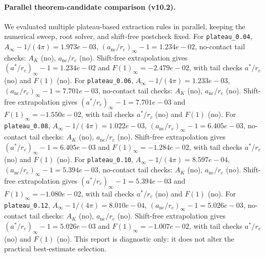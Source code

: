 \paragraph{Parallel theorem-candidate comparison (v10.2).}
We evaluated multiple plateau-based extraction rules in parallel, keeping the numerical sweep, root solver, and shift-free postcheck fixed. For \texttt{plateau_0.04}, $A_\infty-1/(4\pi)=1.973e-03$, $(a_{\mathrm{nc}}/r_c)_\infty-1=1.234e-02$, no-contact tail checks: $A_K$ (no), $a_{\mathrm{nc}}/r_c$ (no). Shift-free extrapolation gives $(a^*/r_c)_\infty-1=1.234e-02$ and $F(1)_\infty=-2.479e-02$, with tail checks $a^*/r_c$ (no) and $F(1)$ (no). For \texttt{plateau_0.06}, $A_\infty-1/(4\pi)=1.233e-03$, $(a_{\mathrm{nc}}/r_c)_\infty-1=7.701e-03$, no-contact tail checks: $A_K$ (no), $a_{\mathrm{nc}}/r_c$ (no). Shift-free extrapolation gives $(a^*/r_c)_\infty-1=7.701e-03$ and $F(1)_\infty=-1.550e-02$, with tail checks $a^*/r_c$ (no) and $F(1)$ (no). For \texttt{plateau_0.08}, $A_\infty-1/(4\pi)=1.022e-03$, $(a_{\mathrm{nc}}/r_c)_\infty-1=6.405e-03$, no-contact tail checks: $A_K$ (no), $a_{\mathrm{nc}}/r_c$ (no). Shift-free extrapolation gives $(a^*/r_c)_\infty-1=6.405e-03$ and $F(1)_\infty=-1.284e-02$, with tail checks $a^*/r_c$ (no) and $F(1)$ (no). For \texttt{plateau_0.10}, $A_\infty-1/(4\pi)=8.597e-04$, $(a_{\mathrm{nc}}/r_c)_\infty-1=5.394e-03$, no-contact tail checks: $A_K$ (no), $a_{\mathrm{nc}}/r_c$ (no). Shift-free extrapolation gives $(a^*/r_c)_\infty-1=5.394e-03$ and $F(1)_\infty=-1.080e-02$, with tail checks $a^*/r_c$ (no) and $F(1)$ (no). For \texttt{plateau_0.12}, $A_\infty-1/(4\pi)=8.010e-04$, $(a_{\mathrm{nc}}/r_c)_\infty-1=5.026e-03$, no-contact tail checks: $A_K$ (no), $a_{\mathrm{nc}}/r_c$ (no). Shift-free extrapolation gives $(a^*/r_c)_\infty-1=5.026e-03$ and $F(1)_\infty=-1.007e-02$, with tail checks $a^*/r_c$ (no) and $F(1)$ (no). This report is diagnostic only: it does not alter the practical best-estimate selection.
